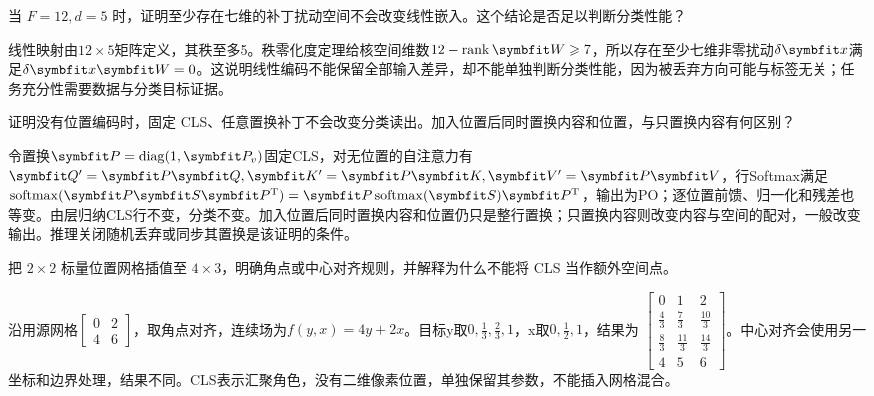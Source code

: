 \begin{exercises}
\begin{exercise}\optional 当 $F=12,d=5$ 时，证明至少存在七维的补丁扰动空间不会改变线性嵌入。这个结论是否足以判断分类性能？

\begin{solution}
线性映射由$12\times5$矩阵定义，其秩至多5。秩零化度定理给核空间维数$12-\operatorname{rank}\mat{W}\ge7$，所以存在至少七维非零扰动$\delta \vect{x}$满足$\delta \vect{x}\mat{W}=0$。这说明线性编码不能保留全部输入差异，却不能单独判断分类性能，因为被丢弃方向可能与标签无关；任务充分性需要数据与分类目标证据。
\end{solution}
\end{exercise}

\begin{exercise} 证明没有位置编码时，固定 CLS、任意置换补丁不会改变分类读出。加入位置后同时置换内容和位置，与只置换内容有何区别？

\begin{solution}
令置换$\mat{P}=\operatorname{diag}(1,\mat{P}_v)$固定CLS，对无位置的自注意力有$\mat{Q}'=\mat{P}\mat{Q},\mat{K}'=\mat{P}\mat{K},\mat{V}'=\mat{P}\mat{V}$，行Softmax满足$\operatorname{softmax}(\mat{P}\mat{S}\mat{P}^{\mathrm{T}})=\mat{P}\operatorname{softmax}(\mat{S})\mat{P}^{\mathrm{T}}$，输出为PO；逐位置前馈、归一化和残差也等变。由层归纳CLS行不变，分类不变。加入位置后同时置换内容和位置仍只是整行置换；只置换内容则改变内容与空间的配对，一般改变输出。推理关闭随机丢弃或同步其置换是该证明的条件。
\end{solution}
\end{exercise}

\begin{exercise} 把 $2\times2$ 标量位置网格插值至 $4\times3$，明确角点或中心对齐规则，并解释为什么不能将 CLS 当作额外空间点。

\begin{solution}
沿用源网格$\left[\begin{smallmatrix}0&2\\4&6\end{smallmatrix}\right]$，取角点对齐，连续场为$f(y,x)=4y+2x$。目标y取$0,\frac{1}{3},\frac{2}{3},1$，x取$0,\frac{1}{2},1$，结果为 $\left[\begin{smallmatrix}0&1&2\\\frac{4}{3}&\frac{7}{3}&\frac{10}{3}\\\frac{8}{3}&\frac{11}{3}&\frac{14}{3}\\4&5&6\end{smallmatrix}\right]$。中心对齐会使用另一坐标和边界处理，结果不同。CLS表示汇聚角色，没有二维像素位置，单独保留其参数，不能插入网格混合。
\end{solution}
\end{exercise}


\end{exercises}
